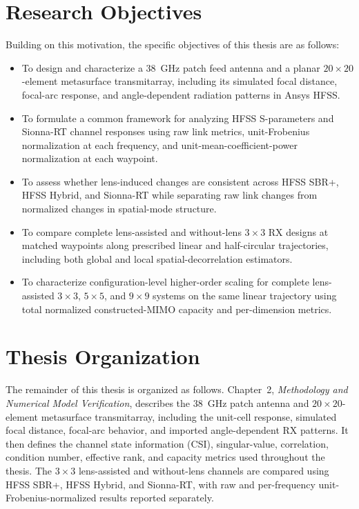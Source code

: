 \section{Research Objectives}
Building on this motivation, the specific objectives of this thesis are as follows:
\begin{itemize}
    \item To design and characterize a 38~GHz patch feed antenna and a planar $20\times20$-element metasurface transmitarray, including its simulated focal distance, focal-arc response, and angle-dependent radiation patterns in Ansys HFSS\@.
    \item To formulate a common framework for analyzing HFSS S-parameters and Sionna-RT channel responses using raw link metrics, unit-Frobenius normalization at each frequency, and unit-mean-coefficient-power normalization at each waypoint.
    \item To assess whether lens-induced changes are consistent across HFSS SBR+, HFSS Hybrid, and Sionna-RT while separating raw link changes from normalized changes in spatial-mode structure.
    \item To compare complete lens-assisted and without-lens $3\times3$ RX designs at matched waypoints along prescribed linear and half-circular trajectories, including both global and local spatial-decorrelation estimators.
    \item To characterize configuration-level higher-order scaling for complete lens-assisted $3\times3$, $5\times5$, and $9\times9$ systems on the same linear trajectory using total normalized constructed-MIMO capacity and per-dimension metrics.
\end{itemize}

\section{Thesis Organization}

The remainder of this thesis is organized as follows. Chapter~2, \textit{Methodology and Numerical Model Verification}, describes the 38~GHz patch antenna and $20\times20$-element metasurface transmitarray, including the unit-cell response, simulated focal distance, focal-arc behavior, and imported angle-dependent RX patterns. It then defines the channel state information (CSI), singular-value, correlation, condition number, effective rank, and capacity metrics used throughout the thesis. The $3\times3$ lens-assisted and without-lens channels are compared using HFSS SBR+, HFSS Hybrid, and Sionna-RT, with raw and per-frequency unit-Frobenius-normalized results reported separately.

